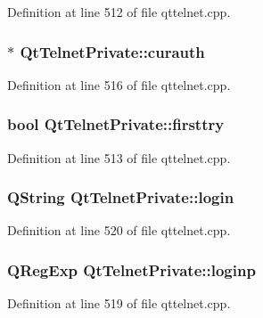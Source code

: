 Definition at line 512 of file qttelnet.cpp.

\hypertarget{classQtTelnetPrivate_a5ba83994ceb1886f9aa8751edc289c2e}{
\subsubsection[{curauth}]{$\ast$ {\bf QtTelnetPrivate::curauth}}}
\label{classQtTelnetPrivate_a5ba83994ceb1886f9aa8751edc289c2e}


Definition at line 516 of file qttelnet.cpp.

\hypertarget{classQtTelnetPrivate_a5c08132513e77454325480668f3ced49}{
\subsubsection[{firsttry}]{\setlength{\rightskip}{0pt plus 5cm}bool {\bf QtTelnetPrivate::firsttry}}}
\label{classQtTelnetPrivate_a5c08132513e77454325480668f3ced49}


Definition at line 513 of file qttelnet.cpp.

\hypertarget{classQtTelnetPrivate_ae443a4bb75c5d2398e4810791902a4c3}{
\subsubsection[{login}]{\setlength{\rightskip}{0pt plus 5cm}QString {\bf QtTelnetPrivate::login}}}
\label{classQtTelnetPrivate_ae443a4bb75c5d2398e4810791902a4c3}


Definition at line 520 of file qttelnet.cpp.

\hypertarget{classQtTelnetPrivate_a9e259a89ff0c66c78f16f63ec52307f5}{
\subsubsection[{loginp}]{\setlength{\rightskip}{0pt plus 5cm}QRegExp {\bf QtTelnetPrivate::loginp}}}
\label{classQtTelnetPrivate_a9e259a89ff0c66c78f16f63ec52307f5}


Definition at line 519 of file qttelnet.cpp.

